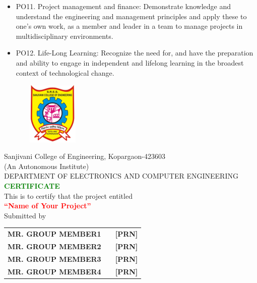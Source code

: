 \documentclass[12pt]{report}	%
\begin{document}
\begin{itemize}
    \item PO11. Project management and finance: Demonstrate knowledge and understand the engineering and management principles and apply these to one’s own work, as a member and leader in a team to manage projects in multidisciplinary environments.
    \item PO12. Life-Long Learning: Recognize the need for, and have the preparation and ability to engage in independent and lifelong learning in the broadest context of technological change.
\end{itemize}
\thisfancypage{\setlength{\fboxsep}{10pt}\doublebox}{}	
\begin{titlepage}
\begin{center}
\begin{figure}[h]
\begin{center}
\includegraphics[width=3cm,height=3cm]{logo}\\
        \end{center}
        \end{figure}
        
	{  Sanjivani College of Engineering, Kopargaon-423603 }\\
 { (An Autonomous Institute)}\\
   { DEPARTMENT OF ELECTRONICS AND COMPUTER ENGINEERING}\\
   \vspace{0.2in}
  {\LARGE\textbf{\bf \textcolor{green}{CERTIFICATE}}}\\
  \vspace{0.1in}
		{\small This is to certify that the  project entitled}\\
		\textbf{\bf \textcolor{red}{``Name of Your Project''}}\\
		{\small Submitted by}\\
		\end{center}
  
\begin{table}[H]
\centering
\begin{tabular}{lll}
{{\color[HTML]{58429B} \textbf{MR. GROUP MEMBER1}}} &  & {{\color[HTML]{58429B} \textbf{{[}PRN{]}}}} \\
{\color[HTML]{58429B} \textbf{MR. GROUP MEMBER2}}                     &  & {\color[HTML]{58429B} \textbf{{[}PRN{]}}}                     \\
{\color[HTML]{58429B} \textbf{MR. GROUP MEMBER3}}                          &  & {\color[HTML]{58429B} \textbf{{[}PRN{]}}}                     \\
{\color[HTML]{58429B} \textbf{MR. GROUP MEMBER4}}                      &  & {\color[HTML]{58429B} \textbf{{[}PRN{]}}}                    
\end{tabular}
\end{table}


\end{titlepage}
\end{document}
